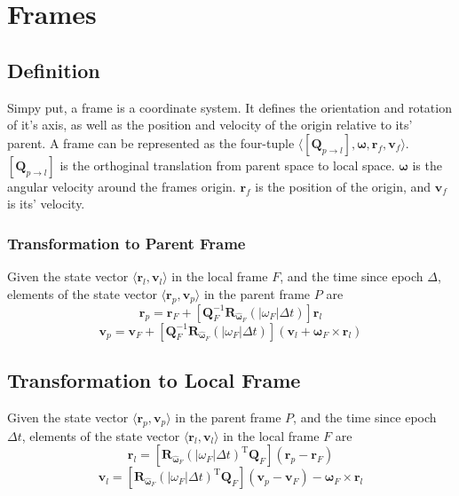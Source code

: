 \section{Frames}
\subsection{Definition}
Simpy put, a frame is a coordinate system. It defines the orientation and rotation of it's axis, as well as the position and
velocity of the origin relative to its' parent. A frame can be represented as the four-tuple
$\langle \left[\mathbf{Q}_{p\to l}\right], \mathbf{\omega}, \mathbf{r}_f, \mathbf{v}_f \rangle$.
$\left[\mathbf{Q}_{p\to l}\right]$ is the orthoginal translation from parent space to local space.
$\mathbf{\omega}$ is the angular velocity around the frames origin. $\mathbf{r}_f$ is the position of the origin, and $\mathbf{v}_f$
is its' velocity.

\subsubsection{Transformation to Parent Frame}
Given the state vector $\langle \mathbf{r}_l, \mathbf{v}_l \rangle$ in the local frame $F$, and the time since epoch $\Delta$,
elements of the state vector $\langle \mathbf{r}_p, \mathbf{v}_p \rangle$ in the parent frame $P$ are
\begin{equation}
    \label{frame_local_to_parent_r}
    \mathbf{r}_p=\mathbf{r}_{F}+\left[
            \mathbf{Q}_{F}^{-1}\mathbf{R}_{\hat{\mathbf{\omega}}_{F}}\left(|\omega_{F}|\Delta{}t\right)
        \right]\mathbf{r}_l
\end{equation}
\begin{equation}
    \label{frame_local_to_parent_v}
    \mathbf{v}_p=\mathbf{v}_{F}+\left[
            \mathbf{Q}_{F}^{-1}\mathbf{R}_{\hat{\mathbf{\omega}}_{F}}\left(|\omega_{F}|\Delta{}t\right)
        \right]\left(\mathbf{v}_l+\mathbf{\omega}_{F}\times\mathbf{r}_l\right)
\end{equation}

\subsection{Transformation to Local Frame}
Given the state vector $\langle \mathbf{r}_p, \mathbf{v}_p \rangle$ in the parent frame $P$, and the time since epoch $\Delta{}t$,
elements of the state vector $\langle \mathbf{r}_l, \mathbf{v}_l \rangle$ in the local frame $F$ are
\begin{equation}
    \label{frame_parent_to_local_r}
    \mathbf{r}_l=\left[
            {\mathbf{R}_{\hat{\mathbf{\omega}}_{F}}\left(|\omega_{F}|\Delta{}t\right)}^{\mathrm{T}}\mathbf{Q}_{F}
        \right]\left(\mathbf{r}_{p}-\mathbf{r}_{F}\right)
\end{equation}
\begin{equation}
    \label{frame_parent_to_local_v}
    \mathbf{v}_l=\left[
            {\mathbf{R}_{\hat{\mathbf{\omega}}_{F}}\left(|\omega_{F}|\Delta{}t\right)}^{\mathrm{T}}\mathbf{Q}_{F}
        \right]\left(\mathbf{v}_{p}-\mathbf{v}_{F}\right) - \mathbf{\omega}_{F}\times\mathbf{r}_l
\end{equation}


